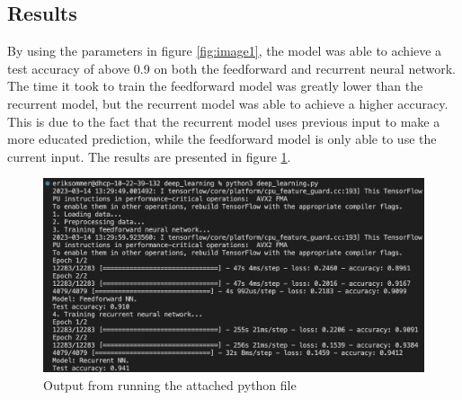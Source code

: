\documentclass{article}
\begin{document}
\newpage

\subsection*{Results}

By using the parameters in figure \ref{fig:image1}, the model was able to achieve a test accuracy of above 0.9 on both the feedforward and recurrent neural network.
The time it took to train the feedforward model was greatly lower than the recurrent model, but the recurrent model was able to achieve a higher accuracy.
This is due to the fact that the recurrent model uses previous input to make a more educated prediction, while the feedforward model is only able to use the current input.
The results are presented in figure \ref{fig:image2}.

\begin{figure}[hbtp]
    \centering
    \includegraphics[width=\linewidth]{output.png}
    \caption{Output from running the attached python file}
    \label{fig:image2}
\end{figure}
\end{document}
